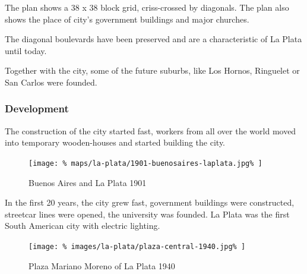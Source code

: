 \documentclass[twocolumn]{article}
\begin{document}
			The plan shows a 38 x 38 block grid, criss-crossed by diagonals. The plan also shows the place of city’s government buildings and major churches.
			
			The diagonal boulevards have been preserved and are a characteristic of La Plata until today.
			
			Together with the city, some of the future suburbs, like Los Hornos, Ringuelet or San Carlos were founded.
			
			
			
			\subsubsection{Development}
			
			The construction of the city started fast, workers from all over the world moved into temporary wooden-houses and started building the city.			
			
			\begin{figure}[H]
				\texttt{[image: \%
					maps/la-plata/1901-buenosaires-laplata.jpg\%
				]}
				\caption{Buenos Aires and La Plata 1901\cite{RiviereDeLaPlata}}
				\label{fig:map:buenosaires-la-plata-1901}
			\end{figure}
			
			
			
			In the first 20 years, the city grew fast, government buildings were constructed, streetcar lines were opened, the university was founded. La Plata was the first South American city with electric lighting.
			
			
			
			
			\begin{figure}[H]
				\texttt{[image: \%
					images/la-plata/plaza-central-1940.jpg\%
				]}
				\caption{Plaza Mariano Moreno of La Plata 1940\cite{Blogspot:Arqruotolo:la-plata-o-la-geometria-hecha-espacio}}
				\label{fig:img:la-plata-1940}
			\end{figure}
			
\end{document}
